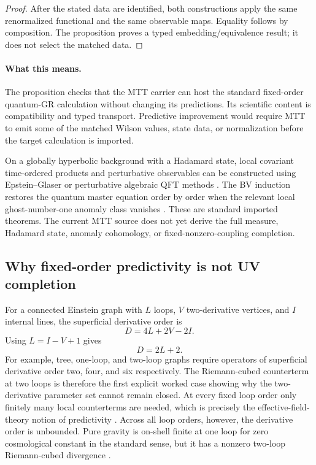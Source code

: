 \documentclass[11pt]{article}
\begin{document}
\begin{proof}
After the stated data are identified, both constructions apply the same
renormalized functional and the same observable maps. Equality follows by
composition. The proposition proves a typed embedding/equivalence result; it
does not select the matched data.
\end{proof}

\paragraph{What this means.}
The proposition checks that the MTT carrier can host the standard
fixed-order quantum-GR calculation without changing its predictions. Its
scientific content is compatibility and typed transport. Predictive
improvement would require MTT to emit some of the matched Wilson values,
state data, or normalization before the target calculation is imported.

On a globally hyperbolic background with a Hadamard state, local covariant
time-ordered products and perturbative observables can be constructed using
Epstein--Glaser or perturbative algebraic QFT methods
\cite{BrunettiFredenhagen2000,HollandsWald2001,HollandsWald2002,Rejzner2016}.
The BV induction restores the quantum master equation order by order when
the relevant local ghost-number-one anomaly class vanishes
\cite{BV1981,BV1983,BarnichBrandtHenneaux2000}. These are standard imported
theorems. The current MTT source does not yet derive the full measure,
Hadamard state, anomaly cohomology, or fixed-nonzero-coupling completion.

\subsection{Why fixed-order predictivity is not UV completion}

For a connected Einstein graph with \(L\) loops, \(V\) two-derivative
vertices, and \(I\) internal lines, the superficial derivative order is
\[
 D=4L+2V-2I.
\]
Using \(L=I-V+1\) gives
\begin{equation}
 D=2L+2.
 \label{eq:power}
\end{equation}
For example, tree, one-loop, and two-loop graphs require operators of
superficial derivative order two, four, and six respectively. The
Riemann-cubed counterterm at two loops is therefore the first explicit
worked case showing why the two-derivative parameter set cannot remain
closed.
At every fixed loop order only finitely many local counterterms are needed,
which is precisely the effective-field-theory notion of predictivity
\cite{Donoghue1994}. Across all loop orders, however, the derivative order is
unbounded. Pure gravity is on-shell finite at one loop for zero cosmological
constant in the standard sense, but it has a nonzero two-loop
Riemann-cubed divergence \cite{tHooftVeltman1974,GoroffSagnotti1985}.
\end{document}

